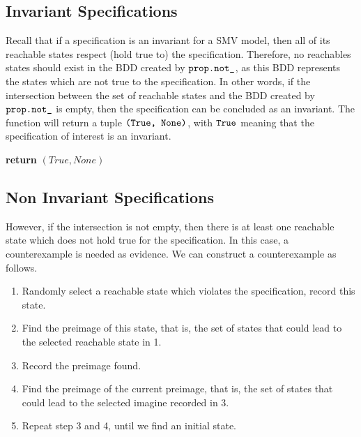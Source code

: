 \documentclass{article}
\begin{document}
\subsection{Invariant Specifications}

Recall that if a specification is an invariant for a SMV model, then all of its reachable states respect (hold true to) the specification. Therefore, no reachables states should exist in the BDD created by $\verb|prop.not_|$, as this BDD represents the states which are not true to the specification. In other words, if the intersection between the set of reachable states and the BDD created by $\verb|prop.not_|$ is empty, then the specification can be concluded as an invariant. The function will return a tuple $\verb|(True, None)|$, with $\verb|True|$ meaning that the specification of interest is an invariant.

\medskip

\begin{algorithmic}[1]
	\State \textbf{return }$(True, None)$
\EndIf
\end{algorithmic}

\subsection{Non Invariant Specifications}

However, if the intersection is not empty, then there is at least one reachable state which does not hold true for the specification. In this case, a counterexample is needed as evidence. We can construct a counterexample as follows.

\begin{enumerate}
	\item Randomly select a reachable state which violates the specification, record this state.
	\item Find the preimage of this state, that is, the set of states that could lead to the selected reachable state in 1.
	\item Record the preimage found.
	\item Find the preimage of the current preimage, that is, the set of states that could lead to the selected imagine recorded in 3.
	\item Repeat step 3 and 4, until we find an initial state.
\end{enumerate}

\medskip
\end{document}
